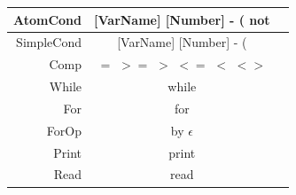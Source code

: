 \documentclass[letterpaper]{article}
\begin{document}
\begin{center}
\begin{tabular}{| r || c | c |}
        \hline
        AtomCond & [VarName] [Number] - ( not & \\
        \hline
        SimpleCond & [VarName] [Number] - ( & \\
        \hline
        Comp & $=$ $>=$ $>$ $<=$ $<$ $<>$ & \\
        \hline
        While & while & \\
        \hline
        For & for & \\
        \hline
        ForOp & by $\epsilon$ & \\
        \hline
        Print & print & \\
        \hline
        Read & read & \\
        \hline
    \end{tabular}
\end{center}
\end{document}
